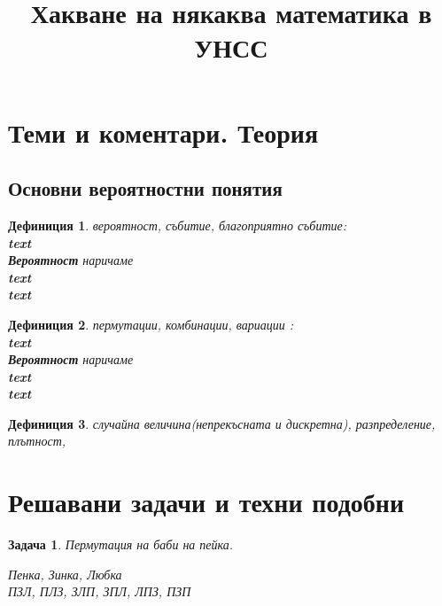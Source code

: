 \documentclass{article}
\title{Хакване на някаква математика в УНСС}
\newtheorem{definition}{Дефиниция}
\newtheorem{problem}{Задача}
\begin{document}
	\maketitle
	
	\section{Теми и коментари. Теория}
	
	\subsection{Основни вероятностни понятия}
	
	\begin{definition}  вероятност, събитие, благоприятно събитие: \\
		\textbf{text} \\
		\textbf{Вероятност} наричаме \\
		\textbf{text}	\\
		\textbf{text} \\

\end{definition}
	
	
\begin{definition} пермутации, комбинации, вариации : \\
	\textbf{text} \\
	\textbf{Вероятност} наричаме \\
	\textbf{text}	\\
	\textbf{text} \\
	
\end{definition}


\begin{definition}
	случайна величина(непрекъсната и дискретна), разпределение, плътност, 
\end{definition}
	
	
	
	\section{Решавани задачи и техни подобни}
	
	\begin{problem}
	Пермутация на баби на пейка. 

	Пенка, Зинка, Любка \\
	ПЗЛ, ПЛЗ, ЗЛП, ЗПЛ, ЛПЗ, ПЗП \\


	\end{problem}	
	
\end{document}
